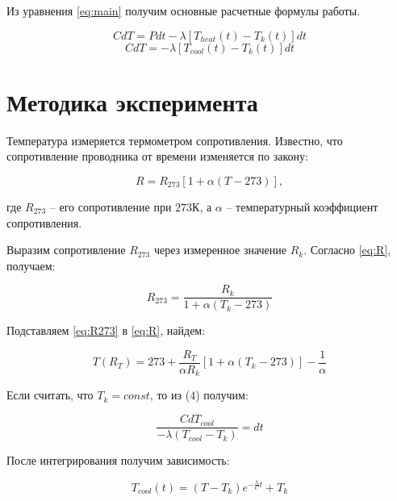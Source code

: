 \documentclass[a4paper]{article}
\begin{document}
Из уравнения \eqref{eq:main} получим основные расчетные формулы работы.

\begin{equation}
    CdT = Pdt - \lambda \left[ T_{heat}(t) - T_k(t) \right]dt
\end{equation}
\begin{equation}
    CdT = - \lambda \left[ T_{cool}(t) - T_k(t) \right]dt
\end{equation}

\section{Методика эксперимента}

Температура измеряется термометром сопротивления.
Известно, что сопротивление проводника от времени изменяется по закону:

\begin{equation}
    R = R_{273} \left[ 1 + \alpha \left( T - 273 \right) \right],
\label{eq:R}
\end{equation}

где $R_{273}$ -- его сопротивление при $273\text{К}$,
а $\alpha$ -- температурный коэффициент сопротивления.

Выразим сопротивление $R_{273}$ через измеренное значение $R_k$.
Согласно \eqref{eq:R}, получаем:

\begin{equation}
    R_{273} = \frac{R_k}{1 + \alpha \left( T_k - 273 \right) }
\label{eq:R273}
\end{equation}

Подставляем \eqref{eq:R273} в \eqref{eq:R}, найдем:

\begin{equation}
    T(R_T) = 273 + \frac{R_T}{\alpha R_k}
            \left[1 + \alpha \left( T_k - 273 \right) \right] - \frac{1}{\alpha}
\end{equation}

Если считать, что $T_k = const$, то из (4) получим:

\begin{equation}
    \frac{CdT_{cool}}{- \lambda \left( T_{cool} - T_k \right) } = dt 
\end{equation}

После интегрирования получим зависимость:

\begin{equation}
    T_{cool}(t) = (T - T_k) e^{- \frac{\lambda }{C}t} + T_k
\label{eq:LC}
\end{equation}
\end{document}
